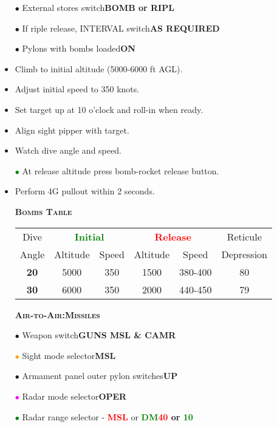 \documentclass[a4paper,12pt,dvipsnames]{letter}
\newcommand{\button}[1]{\textbf{#1}}
\newcommand{\ok}[1]{\textcolor{Green}{\textbf{#1}}}
\newcommand{\warn}[1]{\textcolor{Red}{\textbf{#1}}}
\newcommand{\myHead}[1]{{\LARGE\textsc{\textbf{#1}}}}
\newcommand{\bi}{\textcolor{ProcessBlue}{$\bullet$\;}}
\newcommand{\gi}{\textcolor{Green}{$\bullet$\;}}
\newcommand{\mi}{\textcolor{Magenta}{$\bullet$\;}}
\newcommand{\oi}{\textcolor{Orange}{$\bullet$\;}}
\newcommand{\mcl}[2]{\multicolumn{#1}{|c|}{#2}}
\newcommand{\tb}[1]{\textbf{#1}}
\begin{document}
{\begin{itemize}
 \item[\bi] External stores switch\dotfill\button{BOMB or RIPL}
 \item[\bi] If riple release, INTERVAL switch\dotfill\button{AS REQUIRED}
 \item[\bi] Pylons with bombs loaded\dotfill\button{ON}
 \item Climb to initial altitude (5000-6000 ft AGL).
 \item Adjust initial speed to 350 knots.
 \item Set target up at 10 o'clock and roll-in when ready.
 \item Align sight pipper with target.
 \item Watch dive angle and speed.
 \item[\gi] At release altitude press bomb-rocket release button.
 \item Perform 4G pullout within 2 seconds.
\end{itemize}
\vspace{1em}
\begin{itemize}
 \item[]\myHead{Bombs Table}
 \item[]
\begin{tabular}{c|c|c|c|c|c}
\hline
 Dive   & \mcl{2}{\ok{Initial}} & \mcl{2}{\warn{Release}} & Reticule\\
 Angle  & Altitude & Speed & Altitude & Speed   & Depression\\ \hline
\tb{20} & 5000     & 350   & 1500     & 380-400 & 80        \\ \hline
\tb{30} & 6000     & 350   & 2000     & 440-450 & 79        \\ \hline
\end{tabular}
\end{itemize}
\newpage
\begin{itemize}
 \item[] \myHead{Air-to-Air:\;Missiles}
 \item[\bi] Weapon switch\dotfill\button{GUNS MSL \& CAMR}
 \item[\oi] Sight mode selector\dotfill\button{MSL}
 \item[\bi] Armament panel outer pylon switches\dotfill\button{UP}
 \item[\mi] Radar mode selector\dotfill\button{OPER}
 \item[\gi] Radar range selector - \warn{MSL} or \ok{DM}\dotfill\button{\warn{40} or \ok{10}}

\end{itemize}}
\end{document}
